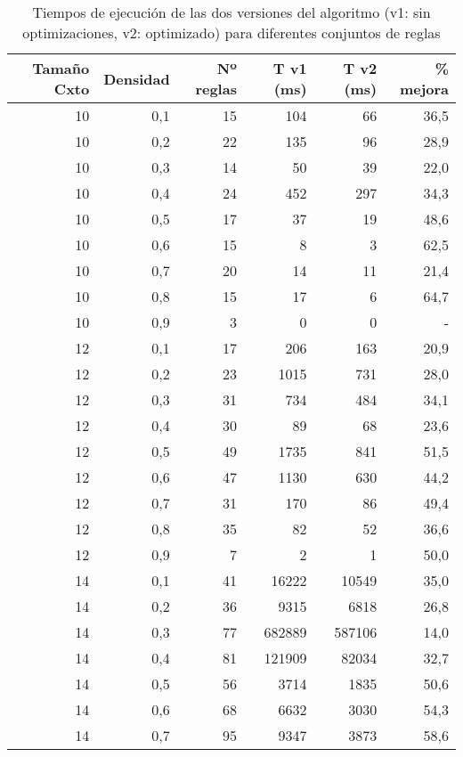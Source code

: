 	\begin{table}[htbp]
		\caption{Tiempos de ejecución de las dos versiones del algoritmo (v1: sin optimizaciones, v2: optimizado) para diferentes conjuntos de reglas}
		\begin{center}
			\begin{tabular}{|r|r|r|r|r|r|}
				\hline
				Tamaño Cxto & Densidad & Nº reglas & T v1 (ms) & T v2 (ms) & \% mejora \\ \hline
					\hline
				10 & 0,1 & 15 & 104 & 66 & 36,5 \\ \hline
				10 & 0,2 & 22 & 135 & 96 & 28,9 \\ \hline
				10 & 0,3 & 14 & 50 & 39 & 22,0 \\ \hline
				10 & 0,4 & 24 & 452 & 297 & 34,3 \\ \hline
				10 & 0,5 & 17 & 37 & 19 & 48,6 \\ \hline
				10 & 0,6 & 15 & 8 & 3 & 62,5 \\ \hline
				10 & 0,7 & 20 & 14 & 11 & 21,4 \\ \hline
				10 & 0,8 & 15 & 17 & 6 & 64,7 \\ \hline
				10 & 0,9 & 3 & 0 & 0 & - \\ \hline
				12 & 0,1 & 17 & 206 & 163 & 20,9 \\ \hline
				12 & 0,2 & 23 & 1015 & 731 & 28,0 \\ \hline
				12 & 0,3 & 31 & 734 & 484 & 34,1 \\ \hline
				12 & 0,4 & 30 & 89 & 68 & 23,6 \\ \hline
				12 & 0,5 & 49 & 1735 & 841 & 51,5 \\ \hline
				12 & 0,6 & 47 & 1130 & 630 & 44,2 \\ \hline
				12 & 0,7 & 31 & 170 & 86 & 49,4 \\ \hline
				12 & 0,8 & 35 & 82 & 52 & 36,6 \\ \hline
				12 & 0,9 & 7 & 2 & 1 & 50,0 \\ \hline
				14 & 0,1 & 41 & 16222 & 10549 & 35,0 \\ \hline
				14 & 0,2 & 36 & 9315 & 6818 & 26,8 \\ \hline
				14 & 0,3 & 77 & 682889 & 587106 & 14,0 \\ \hline
				14 & 0,4 & 81 & 121909 & 82034 & 32,7 \\ \hline
				14 & 0,5 & 56 & 3714 & 1835 & 50,6 \\ \hline
				14 & 0,6 & 68 & 6632 & 3030 & 54,3 \\ \hline
				14 & 0,7 & 95 & 9347 & 3873 & 58,6 \\ \hline

\end{tabular}
\end{center}
\end{table}
